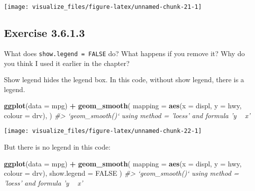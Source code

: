 \documentclass[]{book}
\newenvironment{Shaded}{\begin{snugshade}}{\end{snugshade}}
\newcommand{\CommentTok}[1]{\textcolor[rgb]{0.56,0.35,0.01}{\textit{#1}}}
\newcommand{\DataTypeTok}[1]{\textcolor[rgb]{0.13,0.29,0.53}{#1}}
\newcommand{\KeywordTok}[1]{\textcolor[rgb]{0.13,0.29,0.53}{\textbf{#1}}}
\newcommand{\NormalTok}[1]{#1}
\newcommand{\OperatorTok}[1]{\textcolor[rgb]{0.81,0.36,0.00}{\textbf{#1}}}
\newcommand{\OtherTok}[1]{\textcolor[rgb]{0.56,0.35,0.01}{#1}}
\newcommand{\StringTok}[1]{\textcolor[rgb]{0.31,0.60,0.02}{#1}}
\theoremstyle{plain}
\theoremstyle{remark}
\begin{document}
\begin{center}\texttt{[image: visualize\_files/figure-latex/unnamed-chunk-21-1]} \end{center}

\hypertarget{exercise-3.6.1.3}{%
\subsection*{\texorpdfstring{Exercise
{3.6.1.3}}{Exercise 3.6.1.3}}\label{exercise-3.6.1.3}}

What does \texttt{show.legend\ =\ FALSE} do? What happens if you remove
it? Why do you think I used it earlier in the chapter?

Show legend hides the legend box. In this code, without show legend,
there is a legend.

\begin{Shaded}
\begin{Highlighting}[]
\KeywordTok{ggplot}\NormalTok{(}\DataTypeTok{data =}\NormalTok{ mpg) }\OperatorTok{+}
\StringTok{  }\KeywordTok{geom_smooth}\NormalTok{(}
    \DataTypeTok{mapping =} \KeywordTok{aes}\NormalTok{(}\DataTypeTok{x =}\NormalTok{ displ, }\DataTypeTok{y =}\NormalTok{ hwy, }\DataTypeTok{colour =}\NormalTok{ drv),}
\NormalTok{  )}
\CommentTok{#> `geom_smooth()` using method = 'loess' and formula 'y ~ x'}
\end{Highlighting}
\end{Shaded}

\begin{center}\texttt{[image: visualize\_files/figure-latex/unnamed-chunk-22-1]} \end{center}

But there is no legend in this code:

\begin{Shaded}
\begin{Highlighting}[]
\KeywordTok{ggplot}\NormalTok{(}\DataTypeTok{data =}\NormalTok{ mpg) }\OperatorTok{+}
\StringTok{  }\KeywordTok{geom_smooth}\NormalTok{(}
    \DataTypeTok{mapping =} \KeywordTok{aes}\NormalTok{(}\DataTypeTok{x =}\NormalTok{ displ, }\DataTypeTok{y =}\NormalTok{ hwy, }\DataTypeTok{colour =}\NormalTok{ drv),}
    \DataTypeTok{show.legend =} \OtherTok{FALSE}
\NormalTok{  )}
\CommentTok{#> `geom_smooth()` using method = 'loess' and formula 'y ~ x'}
\end{Highlighting}
\end{Shaded}
\end{document}
